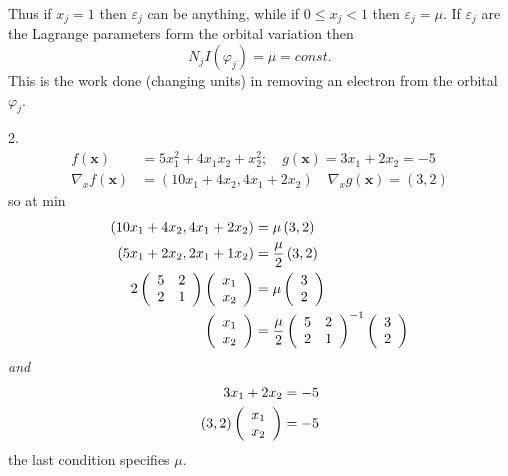 \documentclass[aps,preprint]{revtex4}%
\begin{document}
Thus if $x_{j}=1$ then $\varepsilon_{j}$ can be anything, while if $0\leq
x_{j}<1$ then $\varepsilon_{j}=\mu.$ If $\varepsilon_{j}$ are the Lagrange
parameters form the orbital variation then
\[
N_{j}I\left(  \varphi_{j}\right)  =\mu=const.
\]
This is the work done (changing units) in removing an electron from the
orbital $\varphi_{j}.$

2.
\begin{align*}
f\left(  \boldsymbol{x}\right)   &  =5x_{1}^{2}+4x_{1}x_{2}+x_{2}^{2};\quad
g\left(  \boldsymbol{x}\right)  =3x_{1}+2x_{2}=-5\\
\nabla_{x}f\left(  \boldsymbol{x}\right)   &  =\left(  10x_{1}+4x_{2}%
,4x_{1}+2x_{2}\right)  \quad\nabla_{x}g\left(  \boldsymbol{x}\right)  =\left(
3,2\right)
\end{align*}
so at min
\begin{align*}
\left(  10x_{1}+4x_{2},4x_{1}+2x_{2}\right)   &  =\mu\left(  3,2\right) \\
\left(  5x_{1}+2x_{2},2x_{1}+1x_{2}\right)   &  =\frac{\mu}{2}\left(
3,2\right) \\
2\left(
\begin{array}
[c]{cc}%
5 & 2\\
2 & 1
\end{array}
\right)  \left(
\begin{array}
[c]{c}%
x_{1}\\
x_{2}%
\end{array}
\right)   &  =\mu\left(
\begin{array}
[c]{c}%
3\\
2
\end{array}
\right) \\
\left(
\begin{array}
[c]{c}%
x_{1}\\
x_{2}%
\end{array}
\right)   &  =\frac{\mu}{2}\left(
\begin{array}
[c]{cc}%
5 & 2\\
2 & 1
\end{array}
\right)  ^{-1}\left(
\begin{array}
[c]{c}%
3\\
2
\end{array}
\right)
\end{align*}
\emph{and}
\begin{align*}
3x_{1}+2x_{2}  &  =-5\\
\left(  3,2\right)  \left(
\begin{array}
[c]{c}%
x_{1}\\
x_{2}%
\end{array}
\right)   &  =-5
\end{align*}
the last condition specifies $\mu$.
\end{document}
